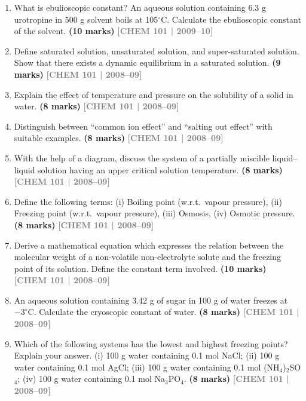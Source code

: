\documentclass[12pt,a3paper]{article}
\newcommand{\yr}[1]{\hfill\textcolor{gray}{\small\textbf{[#1]}}}
\newcommand{\mk}[1]{\textcolor{orange!70!black}{\small\textbf{(#1 marks)}}}
\begin{document}
\begin{enumerate}
\item What is ebulioscopic constant? An aqueous solution containing 6.3 g urotropine in 500 g solvent boils at 105$^\circ$C. Calculate the ebulioscopic constant of the solvent. \mk{10}
\yr{CHEM 101 | 2009--10}



\item Define saturated solution, unsaturated solution, and super-saturated solution. Show that there exists a dynamic equilibrium in a saturated solution. \mk{9}
\yr{CHEM 101 | 2008--09}



\item Explain the effect of temperature and pressure on the solubility of a solid in water. \mk{8}
\yr{CHEM 101 | 2008--09}



\item Distinguish between ``common ion effect'' and ``salting out effect'' with suitable examples. \mk{8}
\yr{CHEM 101 | 2008--09}



\item With the help of a diagram, discuss the system of a partially miscible liquid--liquid solution having an upper critical solution temperature. \mk{8}
\yr{CHEM 101 | 2008--09}



\item Define the following terms: (i) Boiling point (w.r.t.\ vapour pressure), (ii) Freezing point (w.r.t.\ vapour pressure), (iii) Osmosis, (iv) Osmotic pressure. \mk{8}
\yr{CHEM 101 | 2008--09}



\item Derive a mathematical equation which expresses the relation between the molecular weight of a non-volatile non-electrolyte solute and the freezing point of its solution. Define the constant term involved. \mk{10}
\yr{CHEM 101 | 2008--09}



\item An aqueous solution containing 3.42 g of sugar in 100 g of water freezes at $-3^\circ$C. Calculate the cryoscopic constant of water. \mk{8}
\yr{CHEM 101 | 2008--09}



\item Which of the following systems has the lowest and highest freezing points? Explain your answer. (i) 100 g water containing 0.1 mol NaCl; (ii) 100 g water containing 0.1 mol AgCl; (iii) 100 g water containing 0.1 mol (NH$_4$)$_2$SO$_4$; (iv) 100 g water containing 0.1 mol Na$_3$PO$_4$. \mk{8}
\yr{CHEM 101 | 2008--09}




\end{enumerate}
\end{document}
